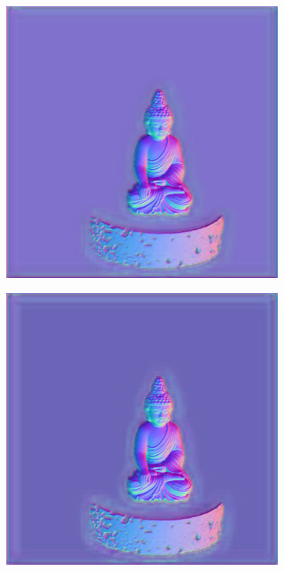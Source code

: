 \begin{figure}[H]
\begin{subfigure}[b]{0.24\linewidth}
	\end{subfigure}
	\begin{subfigure}[b]{0.24\linewidth}
		\includegraphics[width=\linewidth]{./Figures/comparison_real/fancy_eval_0_normal_NNNN-512.png}
	\end{subfigure}
	\begin{subfigure}[b]{0.24\linewidth}
		\includegraphics[width=\linewidth]{./Figures/comparison_real/fancy_eval_0_normal_An2-real-resume.png}
	\end{subfigure}
	

\end{figure}
